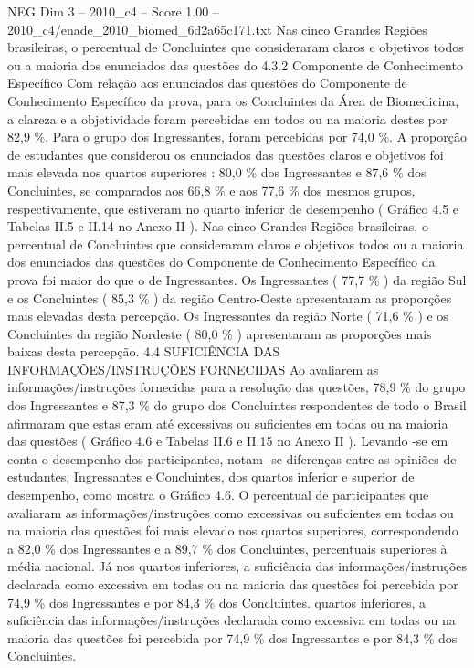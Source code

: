 \begin{textsample}{NEG Dim 3 – 2010\_c4 – Score 1.00 – 2010\_c4/enade\_2010\_biomed\_6d2a65c171.txt}
Nas cinco Grandes Regiões brasileiras, o percentual de Concluintes que consideraram claros e objetivos todos ou a maioria dos enunciados das questões do 4.3.2 Componente de Conhecimento Específico Com relação aos enunciados das questões do Componente de Conhecimento Específico da prova, para os Concluintes da Área de Biomedicina, a clareza e a objetividade foram percebidas em todos ou na maioria destes por 82,9 \%.
Para o grupo dos Ingressantes, foram percebidas por 74,0 \%.
A proporção de estudantes que considerou os enunciados das questões claros e objetivos foi mais elevada nos quartos superiores : 80,0 \% dos Ingressantes e 87,6 \% dos Concluintes, se comparados aos 66,8 \% e aos 77,6 \% dos mesmos grupos, respectivamente, que estiveram no quarto inferior de desempenho ( Gráfico 4.5 e Tabelas II.5 e II.14 no Anexo II ).
Nas cinco Grandes Regiões brasileiras, o percentual de Concluintes que consideraram claros e objetivos todos ou a maioria dos enunciados das questões do Componente de Conhecimento Específico da prova foi maior do que o de Ingressantes.
Os Ingressantes ( 77,7 \% ) da região Sul e os Concluintes ( 85,3 \% ) da região Centro-Oeste apresentaram as proporções mais elevadas desta percepção.
Os Ingressantes da região Norte ( 71,6 \% ) e os Concluintes da região Nordeste ( 80,0 \% ) apresentaram as proporções mais baixas desta percepção. 4.4 SUFICIÊNCIA DAS INFORMAÇÕES/INSTRUÇÕES FORNECIDAS Ao avaliarem as informações/instruções fornecidas para a resolução das questões, 78,9 \% do grupo dos Ingressantes e 87,3 \% do grupo dos Concluintes respondentes de todo o Brasil afirmaram que estas eram até excessivas ou suficientes em todas ou na maioria das questões ( Gráfico 4.6 e Tabelas II.6 e II.15 no Anexo II ).
Levando -se em conta o desempenho dos participantes, notam -se diferenças entre as opiniões de estudantes, Ingressantes e Concluintes, dos quartos inferior e superior de desempenho, como mostra o Gráfico 4.6.
O percentual de participantes que avaliaram as informações/instruções como excessivas ou suficientes em todas ou na maioria das questões foi mais elevado nos quartos superiores, correspondendo a 82,0 \% dos Ingressantes e a 89,7 \% dos Concluintes, percentuais superiores à média nacional.
Já nos quartos inferiores, a suficiência das informações/instruções declarada como excessiva em todas ou na maioria das questões foi percebida por 74,9 \% dos Ingressantes e por 84,3 \% dos Concluintes. quartos inferiores, a suficiência das informações/instruções declarada como excessiva em todas ou na maioria das questões foi percebida por 74,9 \% dos Ingressantes e por 84,3 \% dos Concluintes.

\end{textsample}
